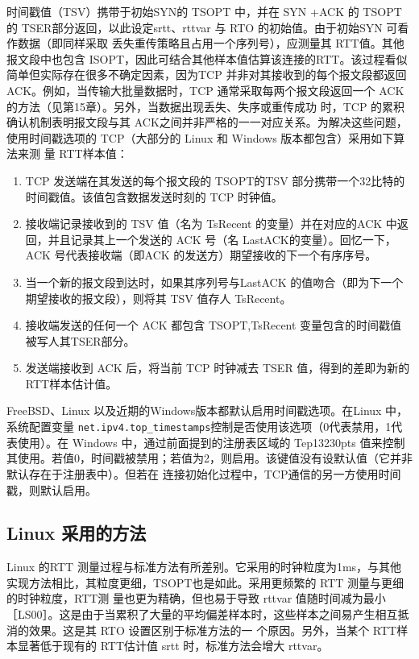 时间戳值（TSV）携带于初始SYN的 TSOPT 中，并在 SYN +ACK 的 TSOPT的 TSER部分返回，以此设定srtt、rttvar 与 RTO 的初始值。由于初始SYN 可看作数据（即同样采取
丢失重传策略且占用一个序列号），应测量其 RTT值。其他报文段中也包含 ISOPT，因此可结合其他样本值估算该连接的RTT。该过程看似简单但实际存在很多不确定因素，因为TCP
并非对其接收到的每个报文段都返回 ACK。例如，当传输大批量数据时，TCP 通常采取每两个报文段返回一个 ACK 的方法（见第15章）。另外，当数据出现丢失、失序或重传成功
时，TCP 的累积确认机制表明报文段与其 ACK之间并非严格的一一对应关系。为解决这些问题，使用时间戳选项的 TCP（大部分的 Linux 和 Windows 版本都包含）采用如下算法来测
量 RTT样本值：
\begin{enumerate}
    \item TCP 发送端在其发送的每个报文段的 TSOPT的TSV 部分携带一个32比特的时间戳值。该值包含数据发送时刻的 TCP 时钟值。
    \item 接收端记录接收到的 TSV 值（名为 TsRecent 的变量）并在对应的ACK 中返回，并且记录其上一个发送的 ACK 号（名 LastACK的变量）。回忆一下，ACK 号代表接收端（即ACK 的发送方）期望接收的下一个有序序号。
    \item 当一个新的报文段到达时，如果其序列号与LastACK 的值吻合（即为下一个期望接收的报文段），则将其 TSV 值存人 TsRecent。
    \item 接收端发送的任何一个 ACK 都包含 TSOPT,TsRecent 变量包含的时间戳值被写人其TSER部分。
    \item 发送端接收到 ACK 后，将当前 TCP 时钟减去 TSER 值，得到的差即为新的RTT样本估计值。
\end{enumerate}
FreeBSD、Linux 以及近期的Windows版本都默认启用时间戳选项。在Linux 中，系统配置变量 \verb|net.ipv4.top_timestamps|控制是否使用该选项（0代表禁用，1代表使用）。在
Windows 中，通过前面提到的注册表区域的 Tep13230pts 值来控制其使用。若值0，时间戳被禁用；若值为2，则启用。该键值没有设默认值（它并非默认存在于注册表中）。但若在
连接初始化过程中，TCP通信的另一方使用时间戳，则默认启用。

\subsection{Linux 采用的方法}

Linux 的RTT 测量过程与标准方法有所差别。它采用的时钟粒度为1ms，与其他实现方法相比，其粒度更细，TSOPT也是如此。采用更频繁的 RTT 测量与更细的时钟粒度，RTT测
量也更为精确，但也易于导致 rttvar 值随时间减为最小［LS00］。这是由于当累积了大量的平均偏差样本时，这些样本之间易产生相互抵消的效果。这是其 RTO 设置区别于标准方法的一
个原因。另外，当某个 RTT样本显著低于现有的 RTT估计值 srtt 时，标准方法会增大 rttvar。

